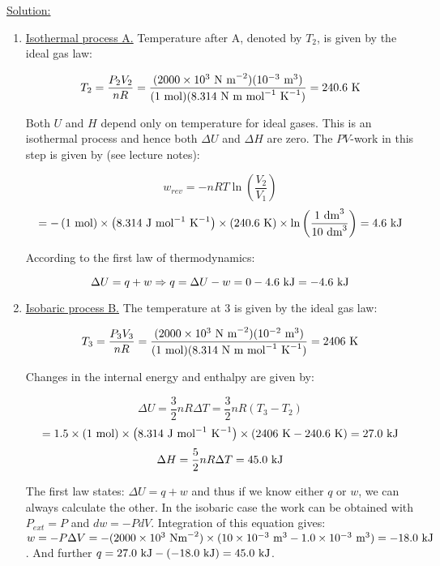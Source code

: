 \noindent
\underline{Solution:}\\

\begin{enumerate}

\item \underline{Isothermal process A.} Temperature after A, denoted by $T_2$, is given by the ideal gas law:

$$T_2 = \frac{P_2V_2}{nR} = \frac{(2000\times 10^3\textnormal{ N m}^{-2})(10^{-3}\textnormal{ m}^3)}{(1\textnormal{ mol})(8.314\textnormal{ N m mol}^{-1}\textnormal{ K}^{-1})} = 240.6\textnormal{ K}$$

Both $U$ and $H$ depend only on temperature for ideal gases. This is an isothermal process and hence both $\Delta U$ and $\Delta H$ are zero. The $PV$-work in this step is given by (see lecture notes):

$$w_{rev} = -nRT\ln\left(\frac{V_2}{V_1}\right)$$
$$ = -\left(1\textnormal{ mol}\right)\times\left(8.314\textnormal{ J mol}^{-1}\textnormal{ K}^{-1}\right)\times\left(240.6\textnormal{ K}\right)\times\ln\left(\frac{1\textnormal{ dm}^3}{10\textnormal{ dm}^3}\right) = 4.6\textnormal{ kJ}$$

According to the first law of thermodynamics:

$$\Delta U = q + w \Rightarrow q = \Delta U - w = 0 - 4.6\textnormal{ kJ} = -4.6\textnormal{ kJ}$$

\item \underline{Isobaric process B.} The temperature at 3 is given by the ideal gas law:

$$T_3 = \frac{P_3V_3}{nR} = \frac{(2000\times10^3\textnormal{ N m}^{-2})(10^{-2}\textnormal{ m}^3)}{(1\textnormal{ mol})(8.314\textnormal{ N m mol}^{-1}\textnormal{ K}^{-1})} = 2406\textnormal{ K}$$

Changes in the internal energy and enthalpy are given by:

$$\Delta U = \frac{3}{2}nR\Delta T = \frac{3}{2}nR\left(T_3 - T_2\right)$$
$$ = 1.5 \times (1\textnormal{ mol}) \times\left( 8.314\textnormal{ J mol}^{-1}\textnormal{ K}^{-1}\right) \times \left( 2406\textnormal{ K} - 240.6\textnormal{ K} \right) = 27.0\textnormal{ kJ}$$
$$\Delta H = \frac{5}{2}nR\Delta T = 45.0\textnormal{ kJ}$$

The first law states: $\Delta U = q + w$ and thus if we know either $q$ or $w$, we can always calculate the other. In the isobaric case the work can be obtained with $P_{ext} = P$ and $dw = -P dV$. Integration of this equation gives: $w = -P\Delta V = -(2000 \times 10^3\textnormal{ Nm}^{-2}) \times (10 \times 10^{-3}\textnormal{ m}^3 - 1.0 \times 10^{-3}\textnormal{ m}^3) = -18.0\textnormal{ kJ}$. And further $q = 27.0\textnormal{ kJ} - (-18.0\textnormal{ kJ}) = 45.0\textnormal{ kJ}$.


\end{enumerate}
